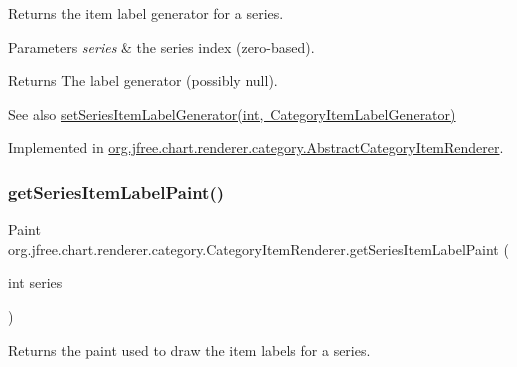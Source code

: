 Returns the item label generator for a series.


\begin{DoxyParams}{Parameters}
{\em series} & the series index (zero-\/based).\\
\hline
\end{DoxyParams}
\begin{DoxyReturn}{Returns}
The label generator (possibly {\ttfamily null}).
\end{DoxyReturn}
\begin{DoxySeeAlso}{See also}
\mbox{\hyperlink{interfaceorg_1_1jfree_1_1chart_1_1renderer_1_1category_1_1_category_item_renderer_a7d50a8f4cf465adb170d97a905f5160c}{set\+Series\+Item\+Label\+Generator(int, Category\+Item\+Label\+Generator)}} 
\end{DoxySeeAlso}


Implemented in \mbox{\hyperlink{classorg_1_1jfree_1_1chart_1_1renderer_1_1category_1_1_abstract_category_item_renderer_a2ec1e67d9952e7d8d39ba4a9f59184f7}{org.\+jfree.\+chart.\+renderer.\+category.\+Abstract\+Category\+Item\+Renderer}}.

\mbox{\label{interfaceorg_1_1jfree_1_1chart_1_1renderer_1_1category_1_1_category_item_renderer_a781dce45cf2ee87d6d891809ef826852}} 
\subsubsection{\texorpdfstring{get\+Series\+Item\+Label\+Paint()}{getSeriesItemLabelPaint()}}
{\footnotesize\ttfamily Paint org.\+jfree.\+chart.\+renderer.\+category.\+Category\+Item\+Renderer.\+get\+Series\+Item\+Label\+Paint (\begin{DoxyParamCaption}\item[{int}]{series }\end{DoxyParamCaption})}

Returns the paint used to draw the item labels for a series.


